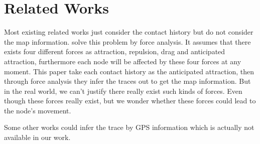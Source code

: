 \section{Related Works}
\label{sec:relate}

Most existing related works just consider the contact history but do not consider the map information. \cite{Whitbeck10:Plausible} solve this problem by force analysis. It assumes that there exists four different forces as attraction, repulsion, drag and anticipated attraction, furthermore each node will be affected by these four forces at any moment. This paper take each contact history as the anticipated attraction, then through force analysis they infer the traces out to get the map information. But in the real world, we can't justify there really exist such kinds of forces. Even though these forces really exist, but we wonder whether these forces could lead to the node's movement.  

Some other works \cite{Vtrack} \cite{Malnet} \cite{Vulnerability} could infer the trace by GPS information which is actually not available in 
our work.

